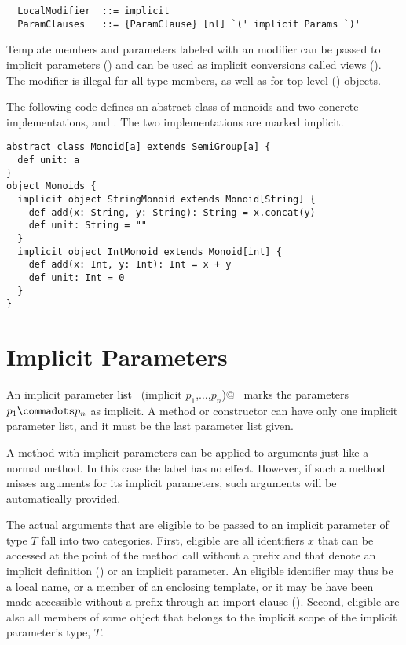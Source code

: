 \syntax\begin{lstlisting}
  LocalModifier  ::= implicit
  ParamClauses   ::= {ParamClause} [nl] `(' implicit Params `)'
\end{lstlisting}

Template members and parameters labeled with an 
modifier can be passed to implicit parameters ()
and can be used as implicit conversions called views
(). The  modifier is illegal for all
type members, as well as for top-level ()
objects.

\example\label{ex:impl-monoid}
The following code defines an abstract class of monoids and
two concrete implementations,  and
. The two implementations are marked implicit.

\begin{lstlisting}
abstract class Monoid[a] extends SemiGroup[a] {
  def unit: a
}
object Monoids {
  implicit object StringMonoid extends Monoid[String] {
    def add(x: String, y: String): String = x.concat(y)
    def unit: String = ""
  }
  implicit object IntMonoid extends Monoid[int] {
    def add(x: Int, y: Int): Int = x + y
    def unit: Int = 0
  }
}
\end{lstlisting}

\section{Implicit Parameters}\label{sec:impl-params}

An implicit parameter list
~\lstinline@(implicit $p_1$,$\ldots$,$p_n$)@~ marks the parameters $p_1 \commadots p_n$ as
implicit. A method or constructor can have only one implicit parameter
list, and it must be the last parameter list given.

A method with implicit parameters can be applied to arguments just
like a normal method. In this case the  label has no
effect. However, if such a method misses arguments for its implicit
parameters, such arguments will be automatically provided.

The actual arguments that are eligible to be passed to an implicit
parameter of type $T$ fall into two categories. First, eligible are
all identifiers $x$ that can be accessed at the point of the method
call without a prefix and that denote an implicit definition
() or an implicit parameter.  An eligible
identifier may thus be a local name, or a member of an enclosing
template, or it may be have been made accessible without a prefix
through an import clause (). Second, eligible are
also all  members of some object that belongs to the
implicit scope of the implicit parameter's type, $T$.

